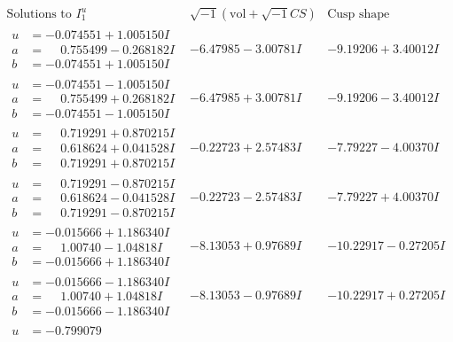 \documentclass[1p]{elsarticle_modified}
\theoremstyle{definition}
\newcommand{\I}{\sqrt{-1}}
\begin{document}
$$\begin{array}{c|c|c}  
\text{Solutions to }I^u_{1}& \I (\text{vol} + \sqrt{-1}CS) & \text{Cusp shape}\\
 \hline 
\begin{aligned}
u &= -0.074551 + 1.005150 I \\
a &= \phantom{-}0.755499 - 0.268182 I \\
b &= -0.074551 + 1.005150 I\end{aligned}
 & -6.47985 - 3.00781 I & -9.19206 + 3.40012 I \\ \hline\begin{aligned}
u &= -0.074551 - 1.005150 I \\
a &= \phantom{-}0.755499 + 0.268182 I \\
b &= -0.074551 - 1.005150 I\end{aligned}
 & -6.47985 + 3.00781 I & -9.19206 - 3.40012 I \\ \hline\begin{aligned}
u &= \phantom{-}0.719291 + 0.870215 I \\
a &= \phantom{-}0.618624 + 0.041528 I \\
b &= \phantom{-}0.719291 + 0.870215 I\end{aligned}
 & -0.22723 + 2.57483 I & -7.79227 - 4.00370 I \\ \hline\begin{aligned}
u &= \phantom{-}0.719291 - 0.870215 I \\
a &= \phantom{-}0.618624 - 0.041528 I \\
b &= \phantom{-}0.719291 - 0.870215 I\end{aligned}
 & -0.22723 - 2.57483 I & -7.79227 + 4.00370 I \\ \hline\begin{aligned}
u &= -0.015666 + 1.186340 I \\
a &= \phantom{-}1.00740 - 1.04818 I \\
b &= -0.015666 + 1.186340 I\end{aligned}
 & -8.13053 + 0.97689 I & -10.22917 - 0.27205 I \\ \hline\begin{aligned}
u &= -0.015666 - 1.186340 I \\
a &= \phantom{-}1.00740 + 1.04818 I \\
b &= -0.015666 - 1.186340 I\end{aligned}
 & -8.13053 - 0.97689 I & -10.22917 + 0.27205 I \\ \hline\begin{aligned}
u &= -0.799079\phantom{ +0.000000I} \\

\end{aligned}
\end{array}$$
\end{document}
